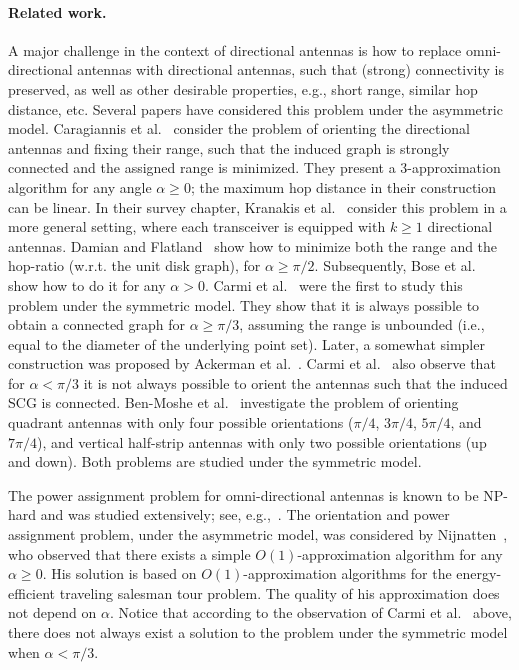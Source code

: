 \documentclass[11pt,letter]{article}
\begin{document}
\paragraph{Related work.}
A major challenge in the context of directional antennas is how to replace omni-directional antennas with directional antennas, such that (strong) connectivity is preserved, as well as other desirable properties, e.g., short range, similar hop distance, etc.
Several papers have considered this problem under the asymmetric model.
Caragiannis et al.~\cite{CKK+08} consider the problem of orienting the directional antennas and fixing their range, such that the induced graph is strongly connected and the assigned range is minimized.
They present a 3-approximation algorithm for any angle $\alpha \geq 0$; the maximum hop distance in their construction can be linear.
In their survey chapter, Kranakis et al.~\cite{KKM} consider this problem in a more general setting, where each transceiver is equipped with $k \geq 1$ directional antennas.
Damian and Flatland~\cite{DF10} show how to minimize both the range and the hop-ratio (w.r.t. the unit disk graph), for $\alpha \geq \pi/2$. Subsequently, Bose et al.~\cite{BCDFKM11} show how to do it for any $\alpha >0$.
Carmi et al.~\cite{CKLR09} were the first to study this problem under the symmetric model. They show that it is always possible to obtain a connected graph for $\alpha \ge \pi/3$, assuming the range is unbounded (i.e., equal to the diameter of the underlying point set). Later, a somewhat simpler construction was proposed by Ackerman et al.~\cite{AGP10}.
Carmi et al.~\cite{CKLR09} also observe that for $\alpha < \pi/3$ it is not always possible to orient the antennas such that the induced SCG is connected.
Ben-Moshe et al.~\cite{bcckms-dawn-10} investigate the problem of orienting quadrant antennas with only four possible orientations ($\pi/4$, $3\pi/4$, $5\pi/4$, and $7\pi/4$), and vertical half-strip antennas with only two possible orientations (up and down). Both problems are studied under the symmetric model.

The power assignment problem for omni-directional antennas is known to be NP-hard and was studied extensively; see, e.g.,~\cite{KKKP00,CPS99,CMZ02,C10}.
The orientation and power assignment problem, under the asymmetric model, was considered by Nijnatten~\cite{N08}, who observed that there exists a simple $O(1)$-approximation algorithm for any $\alpha \ge 0$. His solution is based on $O(1)$-approximation algorithms for the energy-efficient traveling salesman tour problem. The quality of his approximation does not depend on $\alpha$. Notice that according to the observation of Carmi et al.~\cite{CKLR09} above, there does not always exist a solution to the problem under the symmetric model when $\alpha < \pi/3$.
\end{document}

